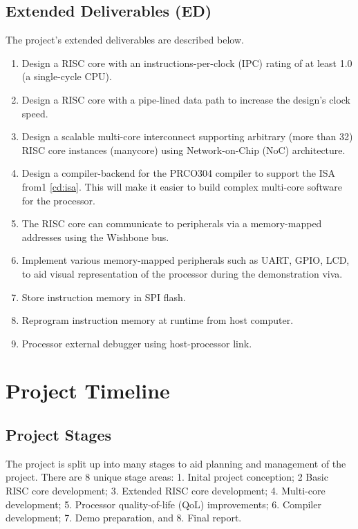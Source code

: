 \documentclass[11pt,a4paper]{report}
\begin{document}
{\subsection{Extended Deliverables (ED)}
The project's extended deliverables are described below.
\begin{enumerate}[leftmargin=2\parindent, label=\bfseries ED\arabic*.]
    \item{Design a RISC core with an instructions-per-clock (IPC) rating of at least 1.0 (a single-cycle CPU).}\label{ed:ipc}
    \item{Design a RISC core with a pipe-lined data path to increase the design's clock speed.}\label{ed:pipeline}
    \item{Design a scalable multi-core interconnect supporting arbitrary (more than 32) RISC core instances (manycore) using Network-on-Chip (NoC) architecture.}\label{ed:scale}
    \item{Design a compiler-backend for the PRCO304 \cite{prco304} compiler to support the ISA from1 \ref{cd:isa}. This will make it easier to build complex multi-core software for the processor.}\label{ed:compiler}
    \item{The RISC core can communicate to peripherals via a memory-mapped addresses using the Wishbone \cite{wishbone} bus.}\label{ed:mmu}
    \item{Implement various memory-mapped peripherals such as UART, GPIO, LCD, to aid visual representation of the processor during the demonstration viva.}\label{ed:peripherals} 
    \item{Store instruction memory in SPI flash.}\label{ed:flash}
    \item{Reprogram instruction memory at runtime from host computer.}\label{ed:program}
    \item{Processor external debugger using host-processor link.}\label{ed:debug}
\end{enumerate}

\section{Project Timeline}\label{sect:timeline}
\subsection{Project Stages}
The project is split up into many stages to aid planning and management of the project. There are 8 unique stage areas: 1. Inital project conception; 2 Basic RISC core development; 3. Extended RISC core development; 4. Multi-core development; 5. Processor quality-of-life (QoL) improvements; 6. Compiler development; 7. Demo preparation, and 8. Final report.

}
\end{document}
